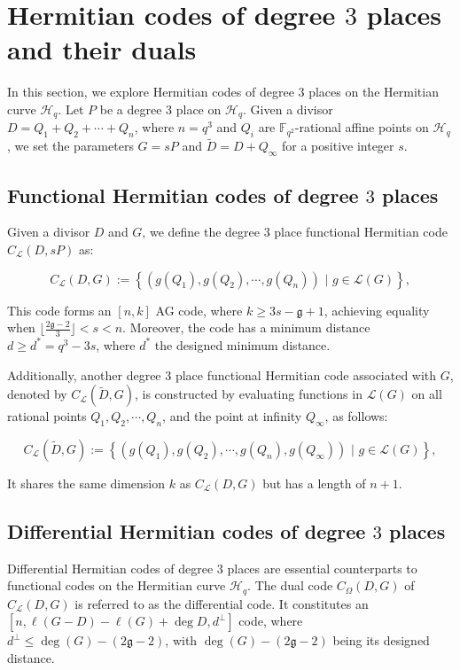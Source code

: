 \documentclass[a4paper]{amsart}
\theoremstyle{plain}
\theoremstyle{definition}
\theoremstyle{remark}
\newcommand{\g}{\mathfrak{g}}
\begin{document}
\section{Hermitian codes of degree $3$ places and their duals}

In this section, we explore Hermitian codes of degree $3$ places on the Hermitian curve $\mathscr{H}_q$. Let $P$ be a degree $3$ place on $\mathscr{H}_q$. Given a divisor $D=Q_1+Q_2+\cdots+Q_n$, where $n=q^3$ and $Q_i$ are $\mathbb{F}_{q^2}$-rational affine points on $\mathscr{H}_q$, we set the parameters $G=sP$ and $\tilde{D}=D+Q_{\infty}$ for a positive integer $s$.


\subsection{Functional Hermitian codes of degree $3$ places}
Given a divisor $D$ and $G$, we define the degree $3$ place functional Hermitian code $C_{\mathcal{L}}(D,sP)$ as:

\[C_{\mathcal{L}}(D,G):= \left\lbrace \left(g(Q_1),g(Q_2),\cdots,g(Q_n) \right)\,\, |\,\, g \in  \mathcal{L}(G) \right\rbrace, \]

This code forms an $[n,k]$ AG code, where $k\geq 3s-\g+1$, achieving equality when $\lfloor\frac{ 2 \g-2}{3}\rfloor <s<n$. Moreover, the code has a minimum distance $d\geq d^*=q^3-3s$, where $d^*$ the designed minimum distance.

Additionally, another degree $3$ place functional Hermitian code associated with $G$, denoted by $C_{\mathcal{L}}(\tilde{D},G)$, is constructed by evaluating functions in $\mathcal{L}(G)$ on all rational points $Q_1,Q_2,\cdots,Q_n$, and the point at infinity $Q_{\infty}$, as follows:

\[C_{\mathcal{L}}(\tilde{D},G):= \left\lbrace \left(g(Q_1),g(Q_2),\cdots,g(Q_n),g(Q_{\infty}) \right)\,\, |\,\, g \in  \mathcal{L}(G)\right\rbrace ,\]

It shares the same dimension $k$ as $C_{\mathcal{L}}(D,G)$ but has a length of $n+1$. 


\subsection{Differential Hermitian codes of degree $3$ places}

Differential Hermitian codes of degree $3$ places are essential counterparts to functional codes on the Hermitian curve $\mathscr{H}_q$. The dual code $C_{\Omega}(D,G)$ of $C_{\mathcal{L}}(D,G)$ is referred to as the differential code. It constitutes an $[n, \ell(G -D)-\ell(G) +\deg D, d^{\perp}]$ code, where $d^{\perp} \leq \deg(G) - (2\g -2)$, with $\deg(G) - (2\g -2)$ being its designed distance.
\end{document}
